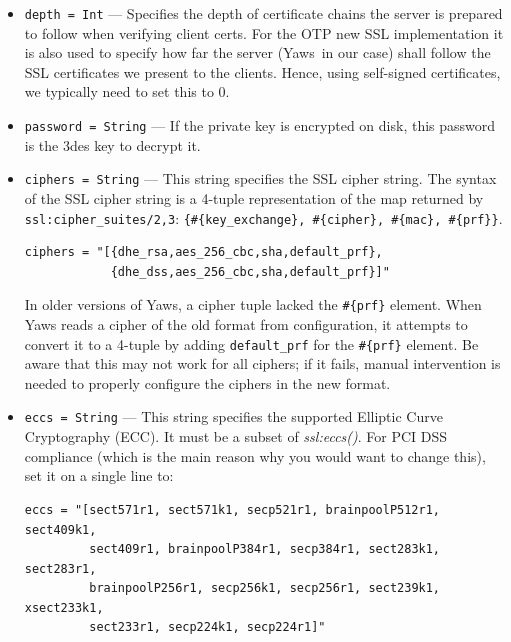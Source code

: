 \documentclass[11pt,oneside,english]{book}
\newcommand{\Yaws}            %
        {{\sc Yaws}}
\begin{document}
\begin{itemize}
\begin{itemize}
               \item \verb+depth = Int+ --- Specifies the depth of certificate
                 chains the server is prepared to follow when verifying client
                 certs. For the OTP new SSL implementation it is also used to
                 specify how far the server (\Yaws\ in our case) shall
                 follow the SSL certificates we present to the clients. Hence,
                 using self-signed certificates, we typically need to set this
                 to 0.

               \item \verb+password = String+ --- If the private key is
                 encrypted on disk, this password is the 3des key to decrypt it.

               \item \verb+ciphers = String+ --- This string specifies the SSL
                 cipher string. The syntax of the SSL cipher string is
                 a 4-tuple representation of the map returned by
                 \verb+ssl:cipher_suites/2,3+:
                 \verb+{#{key_exchange}, #{cipher}, #{mac}, #{prf}}+.
\begin{verbatim}
ciphers = "[{dhe_rsa,aes_256_cbc,sha,default_prf},
            {dhe_dss,aes_256_cbc,sha,default_prf}]"
\end{verbatim}
                 In older versions of Yaws, a cipher tuple lacked the
                 \verb+#{prf}+ element. When Yaws reads a cipher of
                 the old format from configuration, it attempts to
                 convert it to a 4-tuple by adding \verb+default_prf+
                 for the \verb+#{prf}+ element. Be aware that this may
                 not work for all ciphers; if it fails, manual
                 intervention is needed to properly configure the
                 ciphers in the new format.

               \item \verb+eccs = String+ --- This string specifies the
                 supported Elliptic Curve Cryptography (ECC).
                 It must be a subset of \textit{ssl:eccs()}.
                 For PCI DSS compliance (which is the main reason why you
                 would want to change this), set it on a single line to:
\begin{verbatim}
eccs = "[sect571r1, sect571k1, secp521r1, brainpoolP512r1, sect409k1,
         sect409r1, brainpoolP384r1, secp384r1, sect283k1, sect283r1,
         brainpoolP256r1, secp256k1, secp256r1, sect239k1, xsect233k1,
         sect233r1, secp224k1, secp224r1]"
\end{verbatim}


\end{itemize}
\end{itemize}
\end{document}
